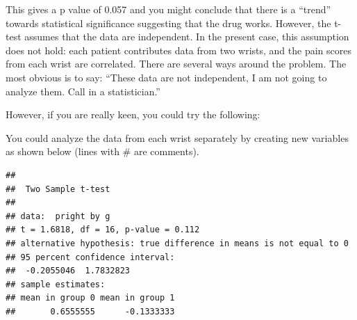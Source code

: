 \documentclass[]{book}
\newenvironment{Shaded}{\begin{snugshade}}{\end{snugshade}}
\newcommand{\CommentTok}[1]{\textcolor[rgb]{0.56,0.35,0.01}{\textit{#1}}}
\newcommand{\DataTypeTok}[1]{\textcolor[rgb]{0.13,0.29,0.53}{#1}}
\newcommand{\DecValTok}[1]{\textcolor[rgb]{0.00,0.00,0.81}{#1}}
\newcommand{\KeywordTok}[1]{\textcolor[rgb]{0.13,0.29,0.53}{\textbf{#1}}}
\newcommand{\NormalTok}[1]{#1}
\newcommand{\OperatorTok}[1]{\textcolor[rgb]{0.81,0.36,0.00}{\textbf{#1}}}
\newcommand{\OtherTok}[1]{\textcolor[rgb]{0.56,0.35,0.01}{#1}}
\newcommand{\StringTok}[1]{\textcolor[rgb]{0.31,0.60,0.02}{#1}}
\begin{document}
This gives a p value of 0.057 and you might conclude that there is a ``trend'' towards statistical significance suggesting that the drug works. However, the t-test assumes that the data are independent. In the present case, this assumption does not hold: each patient contributes data from two wrists, and the pain scores from each wrist are correlated. There are several ways around the problem. The most obvious is to say: ``These data are not independent, I am not going to analyze them. Call in a statistician.''

However, if you are really keen, you could try the following:

You could analyze the data from each wrist separately by creating new variables as shown below (lines with \# are comments).

\begin{Shaded}
\end{Shaded}

\begin{verbatim}
## 
##  Two Sample t-test
## 
## data:  pright by g
## t = 1.6818, df = 16, p-value = 0.112
## alternative hypothesis: true difference in means is not equal to 0
## 95 percent confidence interval:
##  -0.2055046  1.7832823
## sample estimates:
## mean in group 0 mean in group 1 
##       0.6555555      -0.1333333
\end{verbatim}
\end{document}
